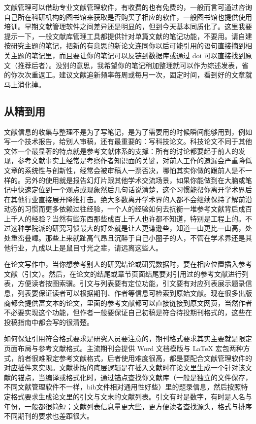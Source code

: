 \documentclass[]{tufte-book}
\begin{document}
文献管理可以借助专业文献管理软件，有收费的也有免费的，一般而言可通过咨询自己所在科研机构的图书馆来获取是否购买了相应的软件，一般图书馆也提供使用培训。早期文献管理软件之间差异还是明显的，但到今天基本同质化了。这里我要提示一下，一般文献库管理工具都提供针对单篇文献的笔记功能，不要用。请自建按研究主题的笔记，把新的有意思的新论文连同你以后可能引用的语句直接摘到相关主题的笔记里，而且要让你的笔记可以反链到数据库或通过 doi 可以直接找到原文（推荐后者）。没别的意思，我希望你的笔记稍加整理就可以作为综述发表，省的你次次重返工。建议文献追新频率每周或每月一次，固定时间，看到好的文章就马上消化掉。

\hypertarget{ux4eceux7cbeux5230ux7528}{%
\subsection{从精到用}\label{ux4eceux7cbeux5230ux7528}}

文献信息的收集与整理不是为了写笔记，是为了需要用的时候瞬间能够用到，例如写一个技术报告，给别人审稿，还有最重要的：写科技论文。科技论文不同于其他文体一个最显著的特点就是参考文献体系的支撑：所有的讨论都要起于前人的发现，参考文献事实上经常是考察作者知识面的关键，对前人工作的遗漏会严重降低文章的系统性与创新性，经常会被审稿人一票否决，哪怕其实你做的跟前人是不一样的。另外的使用就是报告幻灯片跟其他学术交流场景，如果你能做到在大脑或笔记中快速定位到一个观点或现象然后几句话说清楚，这个习惯能帮你离开学术界后在其他行业直接展开降维打击。绝大多数离开学术界的人都不会继续保持了解前沿动态的习惯而更多依赖过往经验，一个人的经验如何去抗衡一堆参考文献背后成百上千人的经验？当然有些东西那些成百上千人也许都不知道，特别是工程上的。不过这种学院派的研究习惯最大的好处就是让人更谦逊些，知道一山更比一山高，处处重峦叠嶂。那些上来就趾高气昂且沉醉于自己小圈子的人，不管在学术界还是其他行业，九成以上是鼠目寸光之辈，请远离这些人。

在论文写作中，当你想参考别人的研究结论或研究数据时，要在相应位置插入参考文献（引文）。然后，在论文的结尾或章节页面结尾要对引用过的参考文献进行列表，方便读者按图索骥。引文与列表要有定位功能，引文要有对应列表展示题录信息，列表要保证读者可以根据期刊、作者等信息可检索到原始文献。现在很多出版商都会提供富文本的论文，里面的参考文献都可以直接链接到原文网页，当然作者不必要实现这个功能，但作者一般要保证自己初稿是符合待投期刊格式的，这些在投稿指南中都会写的很清楚。

如何保证引用符合格式要求是研究人员要注意的，期刊格式要求其实主要就是限定页面布局与参考文献格式。主流期刊会提供 Word 文档模版与 LaTeX 宏包两种方式，前者很难限定参考文献格式，后者使用难度很高，都是要配合文献管理软件的对应插件来实现。文献排版的底层逻辑是在插入文献时在论文里生成一个针对该文献的锚点，当编译或格式化时，通过锚点查找你文献库（一般是独立的文件保存，不同文献管理软件不一样，bib文件相对通用性好些）里的题录信息，然后按照特定格式要求生成论文里的引文与文末的文献列表。引文有时是数字，有时是人名与年份，一般都很简短；文献列表信息量更大些，更方便读者查找源头，格式与排序不同期刊的要求也差距很大。
\end{document}
